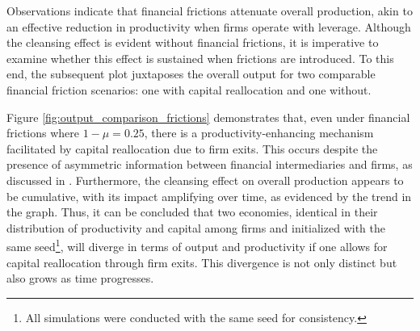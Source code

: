 \documentclass[12pt]{report}
\begin{document}
Observations indicate that financial frictions attenuate overall production, akin to an effective reduction in
productivity when firms operate with leverage. Although the cleansing effect is evident without financial frictions, it
is imperative to examine whether this effect is sustained when frictions are introduced. To this end, the subsequent plot
juxtaposes the overall output for two comparable financial friction scenarios: one with capital reallocation and one
without.

Figure \ref{fig:output_comparison_frictions} demonstrates that, even under financial frictions where \(1- \mu =0.25\),
there is a productivity-enhancing mechanism facilitated by capital reallocation due to firm exits. This occurs despite
the presence of asymmetric information between financial intermediaries and firms, as discussed in \cite{OsePap17}.
Furthermore, the cleansing effect on overall production appears to be cumulative, with its impact amplifying over time,
as evidenced by the trend in the graph. Thus, it can be concluded that two economies, identical in their distribution of
productivity and capital among firms and initialized with the same seed\footnote{All simulations were conducted with the
same seed for consistency.}, will diverge in terms of output and productivity if one allows for capital reallocation
through firm exits. This divergence is not only distinct but also grows as time progresses. 
\medskip

\end{document}
